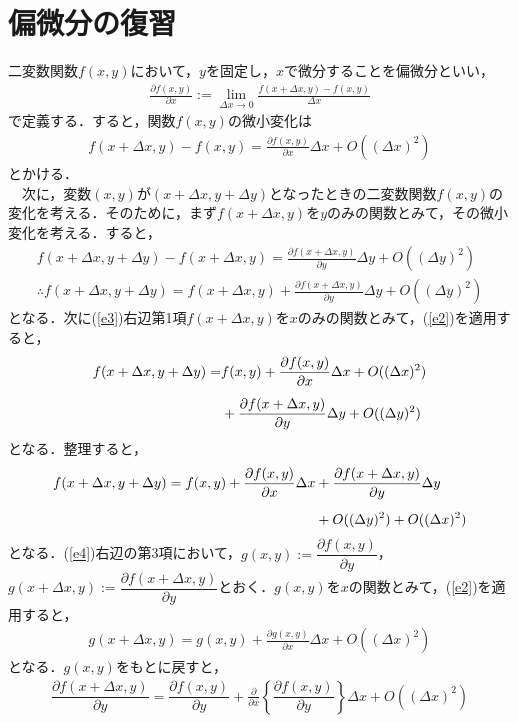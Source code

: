 \section{偏微分の復習}
二変数関数$f(x,y)$において，$y$を固定し，$x$で微分することを偏微分といい，
\begin{align}
\label{e1}
\frac{\partial f(x,y)}{\partial x}:=\lim_{\Delta x\to 0}\frac{f(x+\Delta x,y)-f(x,y)}{\Delta x}
\end{align}
で定義する．すると，関数$f(x,y)$の微小変化は
\begin{align}
\label{e2}
f(x+\Delta x,y)-f(x,y)=\frac{\partial f(x,y)}{\partial x}\Delta x+O((\Delta x)^2)
\end{align}
とかける．\\
　次に，変数$(x,y)$が$(x+\Delta x,y+\Delta y)$となったときの二変数関数$f(x,y)$の変化を考える．そのために，まず$f(x+\Delta x,y)$を$y$のみの関数とみて，その微小変化を考える．すると，
\begin{align}
f(x+\Delta x,y+\Delta y)-f(x+\Delta x,y)=\frac{\partial f(x+\Delta x,y)}{\partial y}\Delta y+O((\Delta y)^2)\\[5pt]
\label{e3}
\therefore
f(x+\Delta x,y+\Delta y)=f(x+\Delta x,y)+\frac{\partial f(x+\Delta x,y)}{\partial y}\Delta y+O((\Delta y)^2)
\end{align}
となる．次に(\ref{e3})右辺第1項$f(x+\Delta x,y)$を$x$のみの関数とみて，(\ref{e2})を適用すると，
\begin{align}
f(x+\Delta x,y+\Delta y)
=&f(x,y)+\frac{\partial f(x,y)}{\partial x}\Delta x+O((\Delta x)^2)\notag\\[5pt]
&+\frac{\partial f(x+\Delta x,y)}{\partial y}\Delta y+O((\Delta y)^2)
\end{align}
となる．整理すると，
\begin{align}\label{e4}
f(x+\Delta x,y+\Delta y)
=f(x,y)+\frac{\partial f(x,y)}{\partial x}\Delta x&+\frac{\partial f(x+\Delta x,y)}{\partial y}\Delta y\notag\\[5pt]
&+O((\Delta y)^2)+O((\Delta x)^2)
\end{align}
となる．(\ref{e4})右辺の第3項において，$g(x,y):=\dfrac{\partial f(x,y)}{\partial y}$，$g(x+\Delta x,y):=\dfrac{\partial f(x+\Delta x,y)}{\partial y}$とおく．$g(x,y)$を$x$の関数とみて，(\ref{e2})を適用すると，
\begin{align}
\label{e5}
g(x+\Delta x,y)=g(x,y)+\frac{\partial g(x,y)}{\partial x}\Delta x+O((\Delta x)^2)
\end{align}
となる．$g(x,y)$をもとに戻すと，
\begin{align}
\label{e6}
\dfrac{\partial f(x+\Delta x,y)}{\partial y}=\dfrac{\partial f(x,y)}{\partial y}+\frac{\partial }{\partial x}
\left\{
\dfrac{\partial f(x,y)}{\partial y}
\right\}
\Delta x+O((\Delta x)^2)
\end{align}

